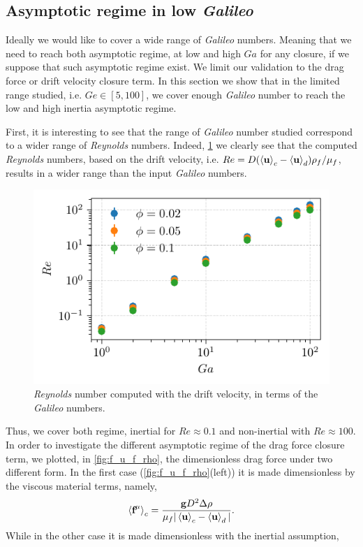 \subsection{Asymptotic regime in low \textit{Galileo}}

Ideally we would like to cover a wide range of \textit{Galileo} numbers. 
Meaning that we need to reach both asymptotic regime, at low and high $Ga$ for any closure, if we suppose that such asymptotic regime exist. 
We limit our validation to the drag force or drift velocity closure term. 
In this section we show that in the limited range studied, i.e. $Ge \in [5,100]$, we cover enough \textit{Galileo} number to reach the low and high inertia asymptotic regime. 

First, it is interesting to see that the range of \textit{Galileo} number studied correspond to a wider range of \textit{Reynolds} numbers. 
Indeed, \ref{fig:Ga_Re} we clearly see that the computed \textit{Reynolds} numbers, based on the drift velocity, i.e. $Re = D (\left<\textbf{u}\right>_c - \left<\textbf{u}\right>_d) \rho_f/\mu_f$, results in a wider range than the input \textit{Galileo} numbers. 
\begin{figure}[h!]
    \centering
    \includegraphics[height= 0.3\textwidth]{image/Dim_3/fCA/Re.pdf}
    \caption{\textit{Reynolds} number computed with the drift velocity, in terms of the \textit{Galileo} numbers.}
    \label{fig:Ga_Re}
\end{figure}
Thus, we cover both regime, inertial for $Re \approx 0.1$ and non-inertial with $Re \approx 100$. 
In order to investigate the different asymptotic regime of the drag force closure term, we plotted, in \ref{fig:f_u_f_rho}, the dimensionless drag force under two different form. 
In the first case (\ref{fig:f_u_f_rho}(left)) it is made dimensionless by the viscous material terms, namely,
\begin{equation*}
    \left<\textbf{f}^\mu\right>_c = \frac{\textbf{g} D^2\Delta \rho}{\mu_f |\left<\textbf{u}\right>_c - \left<\textbf{u}\right>_d|}. 
\end{equation*} 
While in the other case it is made dimensionless with the inertial assumption, 
